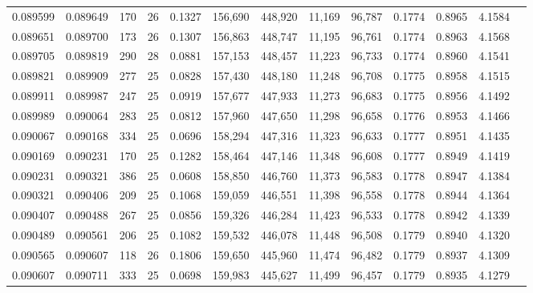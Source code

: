 \begin{tabular}{rrrrrrrrrrrrr}
0.089599 & 0.089649 & 170 &  26 &                                     0.1327 & 156,690 & 448,920 &  11,169 &  96,787 & 0.1774 & 0.8965 & 4.1584 \\
0.089651 & 0.089700 & 173 &  26 &                                     0.1307 & 156,863 & 448,747 &  11,195 &  96,761 & 0.1774 & 0.8963 & 4.1568 \\
0.089705 & 0.089819 & 290 &  28 &                                     0.0881 & 157,153 & 448,457 &  11,223 &  96,733 & 0.1774 & 0.8960 & 4.1541 \\
0.089821 & 0.089909 & 277 &  25 &                                     0.0828 & 157,430 & 448,180 &  11,248 &  96,708 & 0.1775 & 0.8958 & 4.1515 \\
0.089911 & 0.089987 & 247 &  25 &                                     0.0919 & 157,677 & 447,933 &  11,273 &  96,683 & 0.1775 & 0.8956 & 4.1492 \\
0.089989 & 0.090064 & 283 &  25 &                                     0.0812 & 157,960 & 447,650 &  11,298 &  96,658 & 0.1776 & 0.8953 & 4.1466 \\
0.090067 & 0.090168 & 334 &  25 &                                     0.0696 & 158,294 & 447,316 &  11,323 &  96,633 & 0.1777 & 0.8951 & 4.1435 \\
0.090169 & 0.090231 & 170 &  25 &                                     0.1282 & 158,464 & 447,146 &  11,348 &  96,608 & 0.1777 & 0.8949 & 4.1419 \\
0.090231 & 0.090321 & 386 &  25 &                                     0.0608 & 158,850 & 446,760 &  11,373 &  96,583 & 0.1778 & 0.8947 & 4.1384 \\
0.090321 & 0.090406 & 209 &  25 &                                     0.1068 & 159,059 & 446,551 &  11,398 &  96,558 & 0.1778 & 0.8944 & 4.1364 \\
0.090407 & 0.090488 & 267 &  25 &                                     0.0856 & 159,326 & 446,284 &  11,423 &  96,533 & 0.1778 & 0.8942 & 4.1339 \\
0.090489 & 0.090561 & 206 &  25 &                                     0.1082 & 159,532 & 446,078 &  11,448 &  96,508 & 0.1779 & 0.8940 & 4.1320 \\
0.090565 & 0.090607 & 118 &  26 &                                     0.1806 & 159,650 & 445,960 &  11,474 &  96,482 & 0.1779 & 0.8937 & 4.1309 \\
0.090607 & 0.090711 & 333 &  25 &                                     0.0698 & 159,983 & 445,627 &  11,499 &  96,457 & 0.1779 & 0.8935 & 4.1279 \\

\end{tabular}
